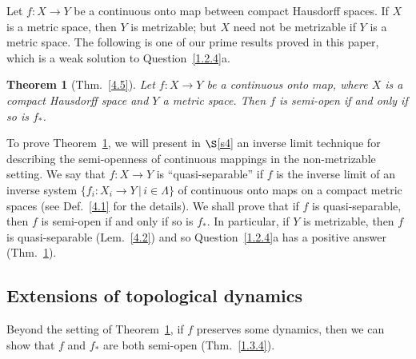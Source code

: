 \documentclass[12pt,final,3p,times]{elsarticle}
\newtheorem{sthm}{Theorem}[subsection]
\theoremstyle{definition}
\numberwithin{equation}{section}
\begin{document}
Let $f\colon X\rightarrow Y$ be a continuous onto map between compact Hausdorff spaces. If $X$ is a metric space, then $Y$ is metrizable; but $X$ need not be metrizable if $Y$ is a metric space.
The following is one of our prime results proved in this paper, which is a weak solution to Question~\ref{1.2.4}a.

\begin{sthm}[Thm.~\ref{4.5}]\label{1.2.5}
    Let $f\colon X\rightarrow Y$ be a continuous onto map, where $X$ is a compact Hausdorff space and $Y$ a metric space. Then $f$ is semi-open if and only if so is $f_*$.
\end{sthm}

To prove Theorem~\ref{1.2.5}, we will present in $\S$\ref{s4} an inverse limit technique for describing the semi-openness of continuous mappings in the non-metrizable setting. We say that $f\colon X\rightarrow Y$ is ``quasi-separable'' if $f$ is the inverse limit of an inverse system $\{f_i\colon X_i\rightarrow Y\,|\,i\in\Lambda\}$ of continuous onto maps on a compact metric spaces (see Def.~\ref{4.1} for the details). We shall prove that if $f$ is quasi-separable, then $f$ is semi-open if and only if so is $f_*$.
In particular, if $Y$ is metrizable, then $f$ is quasi-separable (Lem.~\ref{4.2}) and so Question~\ref{1.2.4}a has a positive answer (Thm.~\ref{1.2.5}).

\subsection{Extensions of topological dynamics}\label{s1.3}
Beyond the setting of Theorem~\ref{1.2.5}, if $f$ preserves some dynamics, then we can show that $f$ and $f_*$ are both semi-open (Thm.~\ref{1.3.4}).
\end{document}

